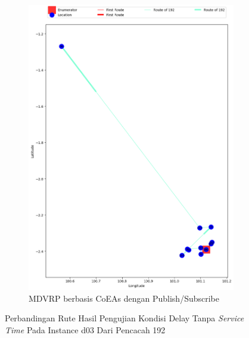 \begin{figure}[H]\ContinuedFloat
	\centering
	\begin{subfigure}[t]{\textwidth}
		\centering
		\includegraphics[width=\textwidth]{Resources/Images/delayed_3/real_m15_n100_delayed_3_192_pubsub_coes}
		\caption{MDVRP berbasis CoEAs dengan Publish/Subscribe}
		\label{fig:real_m15_n100_delayed_3_192_pubsub_coes}
	\end{subfigure}
	\caption{Perbandingan Rute Hasil Pengujian Kondisi Delay Tanpa \textit{Service Time} Pada Instance d03 Dari Pencacah 192}
	\label{fig:real_m15_n100_delayed_3_192_contd}
\end{figure}



